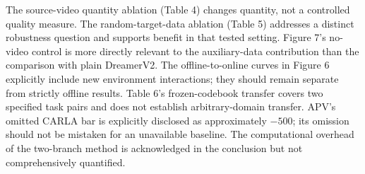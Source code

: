 \documentclass[10pt]{article}
\begin{document}
The source-video quantity ablation (Table 4) changes quantity, not a controlled quality measure. The random-target-data ablation (Table 5) addresses a distinct robustness question and supports benefit in that tested setting. Figure 7’s no-video control is more directly relevant to the auxiliary-data contribution than the comparison with plain DreamerV2. The offline-to-online curves in Figure 6 explicitly include new environment interactions; they should remain separate from strictly offline results. Table 6’s frozen-codebook transfer covers two specified task pairs and does not establish arbitrary-domain transfer. APV’s omitted CARLA bar is explicitly disclosed as approximately \(-500\); its omission should not be mistaken for an unavailable baseline. The computational overhead of the two-branch method is acknowledged in the conclusion but not comprehensively quantified.\par
\end{document}
